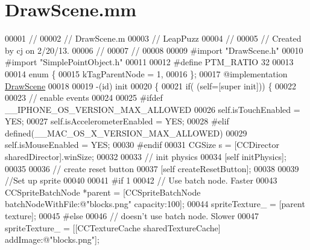 \hypertarget{_draw_scene_8mm}{\section{Draw\-Scene.\-mm}
\label{df/d41/_draw_scene_8mm}
}

\begin{DoxyCode}
00001 \textcolor{comment}{//}
00002 \textcolor{comment}{//  DrawScene.m}
00003 \textcolor{comment}{//  LeapPuzz}
00004 \textcolor{comment}{//}
00005 \textcolor{comment}{//  Created by cj on 2/20/13.}
00006 \textcolor{comment}{//}
00007 \textcolor{comment}{//}
00008 
00009 \textcolor{preprocessor}{#import "DrawScene.h"}
00010 \textcolor{preprocessor}{#import "SimplePointObject.h"}
00011 
00012 \textcolor{preprocessor}{#define PTM\_RATIO 32}
00013 \textcolor{preprocessor}{}
00014 \textcolor{keyword}{enum} \{
00015     kTagParentNode = 1,
00016 \};
00017 \textcolor{keyword}{@implementation }\hyperlink{interface_draw_scene}{DrawScene}
00018 
00019 -(id) init
00020 \{
00021     \textcolor{keywordflow}{if}( (\textcolor{keyword}{self}=[super init])) \{
00022         
00023         \textcolor{comment}{// enable events}
00024         
00025 \textcolor{preprocessor}{#ifdef \_\_IPHONE\_OS\_VERSION\_MAX\_ALLOWED}
00026 \textcolor{preprocessor}{}        \textcolor{keyword}{self}.isTouchEnabled = YES;
00027         \textcolor{keyword}{self}.isAccelerometerEnabled = YES;
00028 \textcolor{preprocessor}{#elif defined(\_\_MAC\_OS\_X\_VERSION\_MAX\_ALLOWED)}
00029 \textcolor{preprocessor}{}        \textcolor{keyword}{self}.isMouseEnabled = YES;
00030 \textcolor{preprocessor}{#endif}
00031 \textcolor{preprocessor}{}        CGSize s = [CCDirector sharedDirector].winSize;
00032         
00033         \textcolor{comment}{// init physics}
00034         [\textcolor{keyword}{self} initPhysics];
00035         
00036         \textcolor{comment}{// create reset button}
00037         [\textcolor{keyword}{self} createResetButton];
00038         
00039         \textcolor{comment}{//Set up sprite}
00040         
00041 \textcolor{preprocessor}{#if 1}
00042 \textcolor{preprocessor}{}        \textcolor{comment}{// Use batch node. Faster}
00043         CCSpriteBatchNode *parent = [CCSpriteBatchNode batchNodeWithFile:@"blocks.png" capacity:100];
00044         spriteTexture\_ = [parent texture];
00045 \textcolor{preprocessor}{#else}
00046 \textcolor{preprocessor}{}        \textcolor{comment}{// doesn't use batch node. Slower}
00047         spriteTexture\_ = [[CCTextureCache sharedTextureCache] addImage:@"blocks.png"];

\end{DoxyCode}
